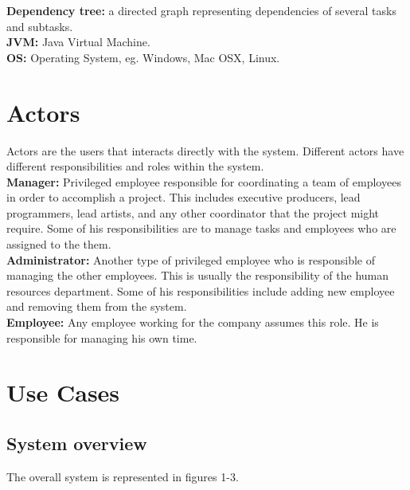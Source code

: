 \documentclass[12pt]{article}
\begin{document}
{\bf Dependency tree:} a directed graph representing dependencies of several tasks
and subtasks. \\

{\bf JVM:} Java Virtual Machine. \\

{\bf OS:} Operating System, eg. Windows, Mac OSX, Linux. \\

\section{Actors}

Actors are the users that interacts directly with the system. Different actors
have different responsibilities and roles within the system. \\

{\bf Manager:} Privileged employee responsible for coordinating a team of employees
in order to accomplish a project. This includes executive producers, lead
programmers, lead artists, and any other coordinator that the project might
require. Some of his responsibilities are to manage tasks and employees who
are assigned to the them. \\

{\bf Administrator:} Another type of privileged employee who is responsible of
managing the other employees. This is usually the responsibility of the human
resources department. Some of his responsibilities include adding new employee
and removing them from the system. \\

{\bf Employee:} Any employee working for the company assumes this role. He is
responsible for managing his own time. \\

\section{Use Cases}

\subsection{System overview}

The overall system is represented in figures 1-3.
\end{document}
